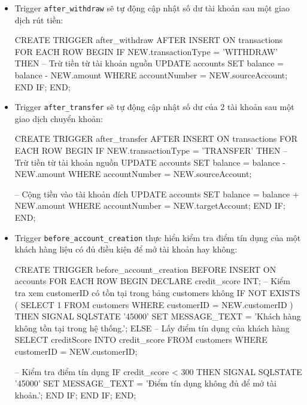 \begin{itemize}
    \item Trigger \texttt{after\_withdraw} sẽ tự động cập nhật số dư tài khoản sau một giao dịch rút tiền:
    \begin{MySQLCode}
    CREATE TRIGGER after_withdraw
    AFTER INSERT ON transactions
    FOR EACH ROW
    BEGIN
        IF NEW.transactionType = 'WITHDRAW' THEN
            -- Trừ tiền từ tài khoản nguồn
            UPDATE accounts
            SET balance = balance - NEW.amount
            WHERE accountNumber = NEW.sourceAccount;
        END IF;
    END;
    \end{MySQLCode}
    
    \item Trigger \texttt{after\_transfer} sẽ tự động cập nhật số dư của 2 tài khoản sau một giao dịch chuyển khoản:
    \begin{MySQLCode}
    CREATE TRIGGER after_transfer
    AFTER INSERT ON transactions
    FOR EACH ROW
    BEGIN
        IF NEW.transactionType = 'TRANSFER' THEN
            -- Trừ tiền từ tài khoản nguồn
            UPDATE accounts
            SET balance = balance - NEW.amount
            WHERE accountNumber = NEW.sourceAccount;

            -- Cộng tiền vào tài khoản đích
            UPDATE accounts
            SET balance = balance + NEW.amount
            WHERE accountNumber = NEW.targetAccount;
        END IF;
    END;
    \end{MySQLCode}

    \item Trigger \texttt{before\_account\_creation} thực hiển kiểm tra điểm tín dụng của một khách hàng liệu có đủ điều kiện để mở tài khoản hay không:
    \begin{MySQLCode}
    CREATE TRIGGER before_account_creation
    BEFORE INSERT ON accounts
    FOR EACH ROW
    BEGIN
        DECLARE credit_score INT;
        -- Kiểm tra xem customerID có tồn tại trong bảng customers không
        IF NOT EXISTS (
            SELECT 1 FROM customers WHERE customerID = NEW.customerID
        ) THEN
            SIGNAL SQLSTATE '45000'
            SET MESSAGE_TEXT = 'Khách hàng không tồn tại trong hệ thống.';
        ELSE
            -- Lấy điểm tín dụng của khách hàng
            SELECT creditScore INTO credit_score
            FROM customers
            WHERE customerID = NEW.customerID;

            -- Kiểm tra điểm tín dụng
            IF credit_score < 300 THEN
                SIGNAL SQLSTATE '45000'
                SET MESSAGE_TEXT = 'Điểm tín dụng không đủ để mở tài khoản.';
            END IF;
        END IF;
    END;
    \end{MySQLCode}
    
\end{itemize}